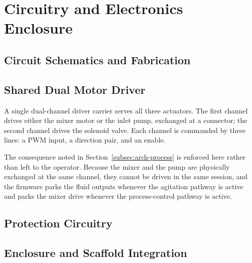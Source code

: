 \section{Circuitry and Electronics Enclosure}
\label{sec:plat-circuitry}

\subsection{Circuit Schematics and Fabrication}
\label{subsec:plat-schematics}


\subsection{Shared Dual Motor Driver}
\label{subsec:plat-driver}

A single dual-channel driver carrier serves all three actuators. The first channel drives either the mixer motor or the inlet pump, exchanged at a connector; the second channel drives the solenoid valve. Each channel is commanded by three lines: a PWM input, a direction pair, and an enable.

The consequence noted in Section~\ref{subsec:arch-process} is enforced here rather than left to the operator. Because the mixer and the pump are physically exchanged at the same channel, they cannot be driven in the same session, and the firmware parks the fluid outputs whenever the agitation pathway is active and parks the mixer drive whenever the process-control pathway is active.


\subsection{Protection Circuitry}
\label{subsec:plat-protection}


\subsection{Enclosure and Scaffold Integration}
\label{subsec:plat-enclosure}

